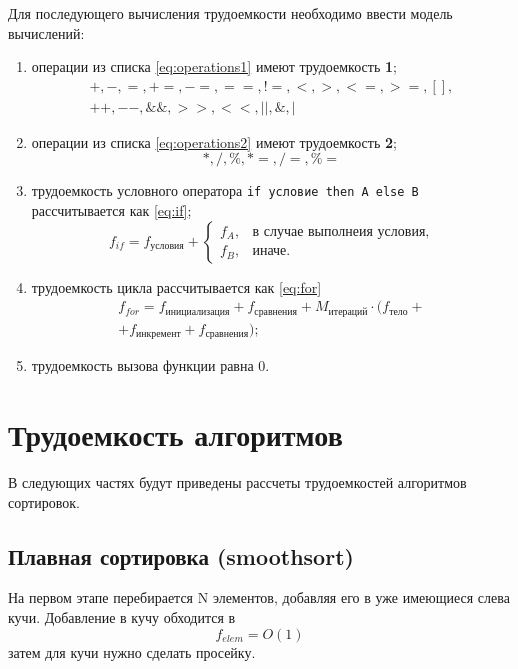 Для последующего вычисления трудоемкости необходимо ввести модель вычислений:

\begin{enumerate}
	\item операции из списка \ref{eq:operations1} имеют трудоемкость \textbf{1};
	\begin{equation}
		\label{eq:operations1}
		\begin{gathered}
			+, -, =, +=, -=, ==, !=, <, >, <=, >=, [], \\ ++, --, \&\&, >>, <<, ||, \&, |
		\end{gathered}
	\end{equation}
	\item операции из списка \ref{eq:operations2} имеют трудоемкость \textbf{2};
	\begin{equation}
		\label{eq:operations2}
		*, /, \%, *=, /=, \%=
	\end{equation}
	\item трудоемкость условного оператора \texttt{if условие then A else B} рассчитывается как \ref{eq:if};
	\begin{equation}
		\label{eq:if}
		f_{if} = f_{\text{условия}} + 
		\begin{cases}
			f_{A}, & \text{в случае выполнеия условия,}\\
			f_{B}, & \text{иначе}.
		\end{cases}
	\end{equation}
	\item трудоемкость цикла рассчитывается как \ref{eq:for}
	\begin{equation}
		\label{eq:for}
		\begin{gathered}
			f_{for} = f_{\text{инициализация}} + f_{\text{сравнения}} + M_{\text{итераций}} \cdot (f_{\text{тело}} +\\
			+ f_{\text{инкремент}} + f_{\text{сравнения}});
		\end{gathered}
	\end{equation}
	\item трудоемкость вызова функции равна 0.
\end{enumerate}

\section{Трудоемкость алгоритмов}
В следующих частях будут приведены рассчеты трудоемкостей алгоритмов сортировок.

\subsection{Плавная сортировка (smoothsort)}
На первом этапе перебирается N элементов, добавляя его в уже имеющиеся слева кучи. Добавление в кучу обходится в
\begin{equation}
  f_{elem} = O(1)
\end{equation}
  затем для кучи нужно сделать просейку.

